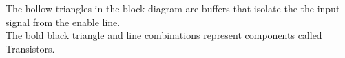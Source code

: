 \documentclass[../TinyBot.tex]{subfiles}
\begin{document}
The hollow triangles in the block diagram are buffers that isolate the the input signal from the enable line. \\



The bold black triangle and line combinations represent components called Transistors. 





    
        




\end{document}
